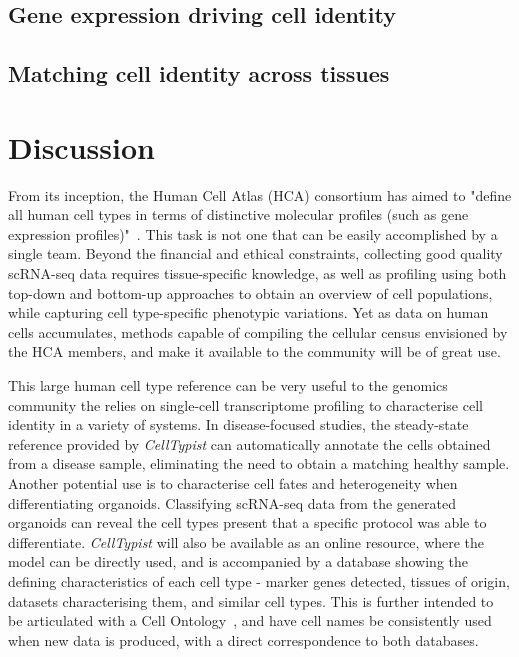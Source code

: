\subsection{Gene expression driving cell identity}
\label{section4.2_genes}



\subsection{Matching cell identity across tissues}
\label{section4.2_tissues}



\section{Discussion}
\label{section4.3}
From its inception, the Human Cell Atlas (HCA) consortium has aimed to "define all human cell types in terms of distinctive molecular profiles (such as gene expression profiles)"~\citep{regev_human_2017}. This task is not one that can be easily accomplished by a single team. Beyond the financial and ethical constraints, collecting good quality scRNA-seq data requires tissue-specific knowledge, as well as profiling using both top-down and bottom-up approaches to obtain an overview of cell populations, while capturing cell type-specific phenotypic variations. Yet as data on human cells accumulates, methods capable of compiling the cellular census envisioned by the HCA members, and make it available to the community will be of great use.



This large human cell type reference can be very useful to the genomics community the relies on single-cell transcriptome profiling to characterise cell identity in a variety of systems. In disease-focused studies, the steady-state reference provided by \textit{CellTypist} can automatically annotate the cells obtained from a disease sample, eliminating the need to obtain a matching healthy sample. Another potential use is to characterise cell fates and heterogeneity when differentiating organoids. Classifying scRNA-seq data from the generated organoids can reveal the cell types present that a specific protocol was able to differentiate. \textit{CellTypist} will also be available as an online resource, where the model can be directly used, and is accompanied by a database showing the defining characteristics of each cell type - marker genes detected, tissues of origin, datasets characterising them, and similar cell types. This is further intended to be articulated with a Cell Ontology~\citep{bard_ontology_2005}, and have cell names be consistently used when new data is produced, with a direct correspondence to both databases.

